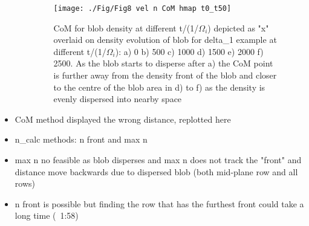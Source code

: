 \documentclass{article}
\begin{document}
\begin{arrowlist}
\begin{itemize}
\begin{itemize}
   \begin{figure}[H]
        \centering
            \texttt{[image: ./Fig/Fig8 vel n CoM hmap t0\_t50]}
            \normalsize{\caption{CoM for blob density at different t/(1/$\Omega_i$) depicted as "x" overlaid on density evolution of blob for delta\_1 example at different t/(1/$\Omega_i$): a) 0 b) 500 c) 1000 d) 1500 e) 2000 f) 2500. As the blob starts to disperse after a) the CoM point is further away from the density front of the blob and closer to the centre of the blob area in d) to f) as the density is evenly dispersed into nearby space}
            \label{fig:fig7}}
        \end{figure}  
                
            \end{itemize}
            \item CoM method displayed the wrong distance, replotted here
            \item n\_calc methods: n front and max n
            \item max n no feasible as blob disperses and max n does not track the "front" and distance move backwards due to dispersed blob (both mid-plane row and all rows)
            \item n front is possible but finding the row that has the furthest front could take a long time (~1:58)
        \end{itemize}
    
\end{arrowlist}



\nocite{*}
\printbibliography[title={References}]
\end{document}
